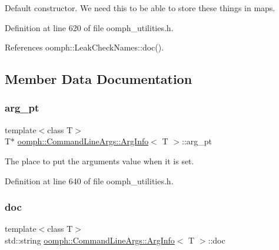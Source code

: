 Default constructor. We need this to be able to store these things in maps. 

Definition at line 620 of file oomph\+\_\+utilities.\+h.



References oomph\+::\+Leak\+Check\+Names\+::doc().



\subsection{Member Data Documentation}
\mbox{\label{structoomph_1_1CommandLineArgs_1_1ArgInfo_a28a76e6c1d710bffb4cc9bc0e93332fd}} 
\subsubsection{\texorpdfstring{arg\+\_\+pt}{arg\_pt}}
{\footnotesize\ttfamily template$<$class T$>$ \\
T$\ast$ \hyperlink{structoomph_1_1CommandLineArgs_1_1ArgInfo}{oomph\+::\+Command\+Line\+Args\+::\+Arg\+Info}$<$ T $>$\+::arg\+\_\+pt}



The place to put the argument\textquotesingle{}s value when it is set. 



Definition at line 640 of file oomph\+\_\+utilities.\+h.

\mbox{\label{structoomph_1_1CommandLineArgs_1_1ArgInfo_ab6bd266840a459d7171a3f532630564d}} 
\subsubsection{\texorpdfstring{doc}{doc}}
{\footnotesize\ttfamily template$<$class T$>$ \\
std\+::string \hyperlink{structoomph_1_1CommandLineArgs_1_1ArgInfo}{oomph\+::\+Command\+Line\+Args\+::\+Arg\+Info}$<$ T $>$\+::doc}



